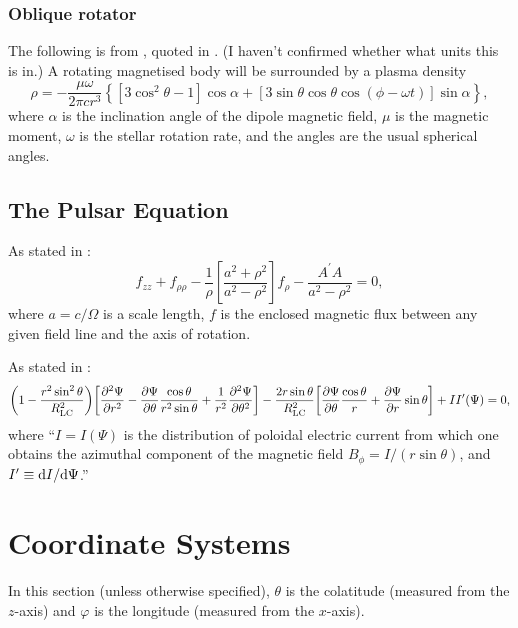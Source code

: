 \documentclass{book}
\newcommand{\phase}{\varphi}
\newcommand{\pd}[2]{\frac{\partial {#1}}{\partial {#2}}}
\newcommand{\ppd}[2]{\frac{\partial^2{#1}}{\partial {#2}^2}}
\begin{document}
\subsection{Oblique rotator}

The following is from \citet{Hones1965}, quoted in \citet{Michel2004}.
(I haven't confirmed whether what units this is in.)
A rotating magnetised body will be surrounded by a plasma density
\begin{equation}
    \rho = -\frac{\mu\omega}{2\pi cr^3} \left\{ [ 3 \cos^2\theta - 1 ] \cos\alpha + \left[ 3 \sin\theta \cos\theta \cos(\phi - \omega t) \right] \sin\alpha \right \},
\end{equation}
where $\alpha$ is the inclination angle of the dipole magnetic field, $\mu$ is the magnetic moment, $\omega$ is the stellar rotation rate, and the angles are the usual spherical angles.

\section{The Pulsar Equation}

As stated in \citet{Michel1982}:
\begin{equation}
    f_{zz} + f_{\rho\rho} - \frac{1}{\rho}\left[\frac{a^2 + \rho^2}{a^2 - \rho^2}\right] f_\rho -
    \frac{A^\prime A}{a^2 - \rho^2} = 0,
\end{equation}
where $a = c/\Omega$ is a scale length, $f$ is the enclosed magnetic flux between any given field line and the axis of rotation.

As stated in \citet{Contopoulos2024}:
\begin{equation}
    \bigg( 1 - \frac{r^2\sin^2\theta}{R_{\rm LC}^2} \bigg)
    \bigg[ \ppd{\Psi}{r} - \pd{\Psi}{\theta} \frac{\cos\theta}{r^2\sin\theta} + \frac{1}{r^2} \ppd{\Psi}{\theta} \bigg] -
    \frac{2r \sin\theta}{R_{\rm LC}^2} \bigg[ \pd{\Psi}{\theta} \frac{\cos\theta}{r} + \pd{\Psi}{r} \sin\theta \bigg] +
    I I^\prime(\Psi) = 0,
\end{equation}
where ``$I = I(\Psi)$ is the distribution of poloidal electric current from which one obtains the azimuthal component of the magnetic field $B_\phi = I/(r \sin\theta)$, and $I^\prime \equiv {\rm d}I/{\rm d}\Psi$.''


\chapter{Coordinate Systems}

In this section (unless otherwise specified), $\theta$ is the colatitude (measured from the $z$-axis) and $\phase$ is the longitude (measured from the $x$-axis).
\end{document}
